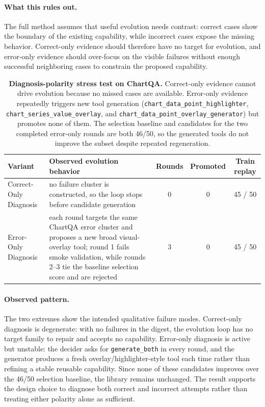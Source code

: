 \paragraph{What this rules out.}
The full method assumes that useful evolution needs contrast: correct cases show the
boundary of the existing capability, while incorrect cases expose the missing behavior.
Correct-only evidence should therefore have no target for evolution, and error-only
evidence should over-focus on the visible failures without enough successful neighboring
cases to constrain the proposed capability.

\begin{table}[t]
\centering
\small
\setlength{\tabcolsep}{4pt}
\renewcommand{\arraystretch}{1.14}
\begin{tabular}{lp{}ccc}
\toprule
\textbf{Variant} & \textbf{Observed evolution behavior}
  & \textbf{Rounds} & \textbf{Promoted} & \textbf{Train replay} \\
\midrule
Correct-Only Diagnosis & no failure cluster is constructed, so the loop stops before
candidate generation
  & 0 & 0 & 45 / 50 \\
Error-Only Diagnosis & each round targets the same ChartQA error cluster and proposes a
new broad visual-overlay tool; round 1 fails smoke validation, while rounds 2--3 tie the
baseline selection score and are rejected
  & 3 & 0 & 45 / 50 \\
\bottomrule
\end{tabular}
\caption{%
  \textbf{Diagnosis-polarity stress test on ChartQA.}
  Correct-only evidence cannot drive evolution because no missed cases are available.
  Error-only evidence repeatedly triggers new tool generation
  (\texttt{chart\_data\_point\_highlighter},
  \texttt{chart\_series\_value\_overlay}, and
  \texttt{chart\_data\_point\_overlay\_generator}) but promotes none of them. The
  selection baseline and candidates for the two completed error-only rounds are both
  46/50, so the generated tools do not improve the subset despite repeated regeneration.
}
\label{tab:ablation_diagnosis_polarity}
\end{table}

\paragraph{Observed pattern.}
The two extremes show the intended qualitative failure modes. Correct-only diagnosis is
degenerate: with no failures in the digest, the evolution loop has no target family to
repair and accepts no capability. Error-only diagnosis is active but unstable: the decider
asks for \texttt{generate\_both} in every round, and the generator produces a fresh
overlay/highlighter-style tool each time rather than refining a stable reusable
capability. Since none of these candidates improves over the 46/50 selection baseline,
the library remains unchanged. The result supports the design choice to diagnose both
correct and incorrect attempts rather than treating either polarity alone as sufficient.

